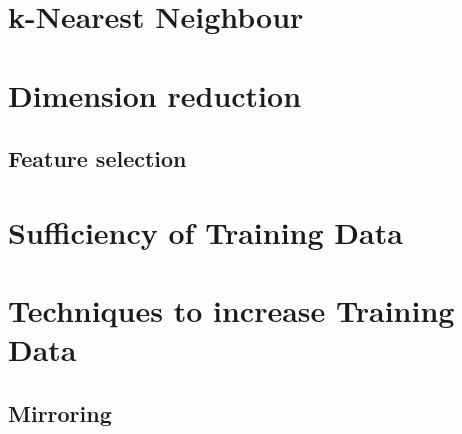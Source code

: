 \section{k-Nearest Neighbour}
\section{Dimension reduction}
\subsection{Feature selection}
\section{Sufficiency of Training Data}
\section{Techniques to increase Training Data}
\subsection{Mirroring}